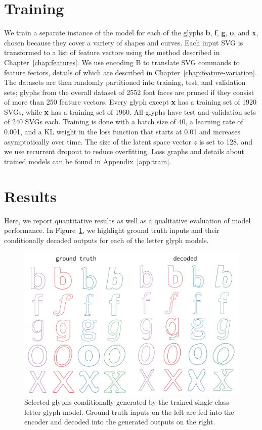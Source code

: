 \section{Training}\label{sec:training}
We train a separate instance of the model for each of the glyphs \textbf{b}, \textbf{f}, \textbf{g}, \textbf{o}, and \textbf{x}, chosen because they cover a variety of shapes and curves.
Each input SVG is transformed to a list of feature vectors using the method described in Chapter~\ref{chap:features}.
We use encoding B to translate SVG commands to feature fectors, details of which are described in Chapter~\ref{chap:feature-variation}.
The datasets are then randomly partitioned into training, test, and validation sets; glyphs from the overall dataset of 2552 font faces are pruned if they consist of more than 250 feature vectors.
Every glyph except \textbf{x} has a training set of 1920 SVGs, while \textbf{x} has a training set of 1960.
All glyphs have test and validation sets of 240 SVGs each.
Training is done with a batch size of 40, a learning rate of 0.001, and a KL weight in the loss function that starts at 0.01 and increases asymptotically over time.
The size of the latent space vector $z$ is set to 128, and we use recurrent dropout to reduce overfitting.
Loss graphs and details about trained models can be found in Appendix~\ref{app:train}.

\section{Results}
Here, we report quantitative results as well as a qualitative evaluation of model performance.
In Figure~\ref{fig:font_gen}, we highlight ground truth inputs and their conditionally decoded outputs for each of the letter glyph models.
\begin{figure}[h]
    \centering
	\includegraphics[width=\textwidth]{figures/font_gen}
    \caption[Visual results of training single-class model on letter glyph datasets]
    {Selected glyphs conditionally generated by the trained single-class letter glyph model.
    Ground truth inputs on the left are fed into the encoder and decoded into the generated outputs on the right.\label{fig:font_gen}}
\end{figure}

